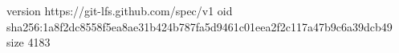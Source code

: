 version https://git-lfs.github.com/spec/v1
oid sha256:1a8f2dc8558f5ea8ae31b424b787fa5d9461c01eea2f2c117a47b9c6a39dcb49
size 4183
